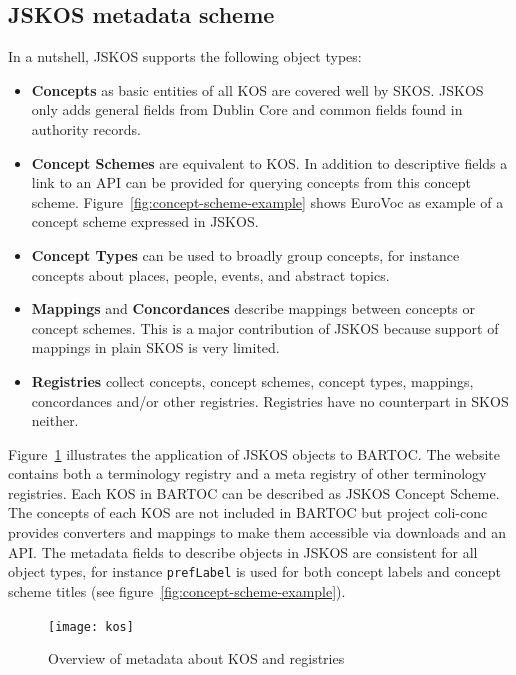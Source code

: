 \documentclass[12pt,a4paper]{llncs}
\begin{document}
\subsection{JSKOS metadata scheme}
In a nutshell, JSKOS supports the following object types:

\begin{itemize}

\item \textbf{Concepts} as basic entities of all KOS are covered well by SKOS. JSKOS only adds general fields from Dublin Core and common fields found in authority records.

\item \textbf{Concept Schemes} are equivalent to KOS. In addition to descriptive  fields a link to an API can be provided for querying concepts from this concept scheme.
Figure~\ref{fig:concept-scheme-example} shows EuroVoc as example of a concept scheme  expressed in JSKOS.

\item \textbf{Concept Types} can be used to broadly group concepts, for instance  concepts about places, people, events, and abstract topics.

\item \textbf{Mappings} and \textbf{Concordances} describe mappings between concepts or concept schemes. This is a major contribution of JSKOS because support of mappings in plain SKOS is very limited.

\item \textbf{Registries} collect concepts, concept schemes, concept types, mappings, concordances and/or other registries. Registries have no counterpart in SKOS neither.
\end{itemize}

\noindent
Figure~\ref{fig:kos} illustrates the application of JSKOS objects to BARTOC. The website contains both a terminology registry and a meta registry of other terminology registries. Each KOS in BARTOC can be described as JSKOS Concept Scheme. The concepts of each KOS are not included in BARTOC but project coli-conc provides converters and mappings to make them accessible via downloads and an API. The metadata fields to describe objects in JSKOS are consistent for all object types, for instance \verb|prefLabel| is used for both concept labels and concept scheme titles (see figure~\ref{fig:concept-scheme-example}).

\begin{figure}
\texttt{[image: kos]}
\caption{Overview of metadata about KOS and registries}
\label{fig:kos}
\end{figure}
\end{document}
